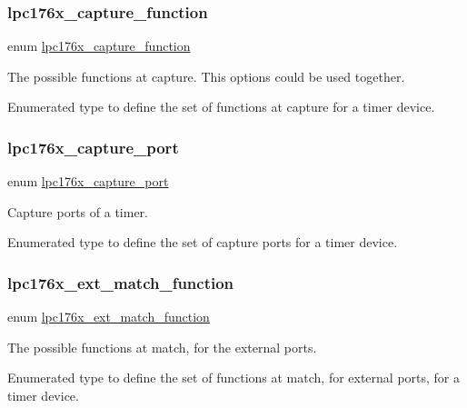 \subsubsection{\texorpdfstring{lpc176x\_capture\_function}{lpc176x\_capture\_function}}
{\footnotesize\ttfamily enum \mbox{\hyperlink{timer-defs_8h_a8f368b1550601e769c7a734d7c7c11a1}{lpc176x\+\_\+capture\+\_\+function}}}



The possible functions at capture. This options could be used together. 

Enumerated type to define the set of functions at capture for a timer device. \mbox{\label{timer-defs_8h_ae5e651b1ca96b94e336b80de49384221}} 
\subsubsection{\texorpdfstring{lpc176x\_capture\_port}{lpc176x\_capture\_port}}
{\footnotesize\ttfamily enum \mbox{\hyperlink{timer-defs_8h_ae5e651b1ca96b94e336b80de49384221}{lpc176x\+\_\+capture\+\_\+port}}}



Capture ports of a timer. 

Enumerated type to define the set of capture ports for a timer device. \mbox{\label{timer-defs_8h_a1b80cd766bc43626c2abfd7f6423bbcb}} 
\subsubsection{\texorpdfstring{lpc176x\_ext\_match\_function}{lpc176x\_ext\_match\_function}}
{\footnotesize\ttfamily enum \mbox{\hyperlink{timer-defs_8h_a1b80cd766bc43626c2abfd7f6423bbcb}{lpc176x\+\_\+ext\+\_\+match\+\_\+function}}}



The possible functions at match, for the external ports. 

Enumerated type to define the set of functions at match, for external ports, for a timer device. \mbox{\label{timer-defs_8h_ab4865a5da7fb70b3fbfa160ab5caf633}} 
